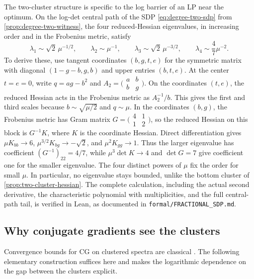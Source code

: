 The two-cluster structure is specific to the log barrier of an LP near
the optimum.  On the log-det central path of the SDP \eqref{eq:degree-two-sdp}
from \cref{prop:degree-two-witness}, the four reduced-Hessian eigenvalues, in
increasing order and in the Frobenius metric, satisfy
\[
 \lambda_1\sim\sqrt2\,\mu^{-1/2},\qquad
 \lambda_2\sim\mu^{-1},\qquad
 \lambda_3\sim\sqrt2\,\mu^{-3/2},\qquad
 \lambda_4\sim\frac47\mu^{-2}.
\]
To derive these, use tangent coordinates $(b,g,t,e)$
for the symmetric matrix with diagonal $(1-g-b,g,b)$ and upper
entries $(b,t,e)$. At the center $t=e=0$, write $q=ag-b^2$ and
$A_2=\bigl(\begin{smallmatrix}a&b\\b&g\end{smallmatrix}\bigr)$.
On the coordinates $(t,e)$, the reduced Hessian acts in the Frobenius
metric as $A_2^{-1}/b$.  This gives the first and third scales because
$b\sim\sqrt{\mu/2}$ and $q\sim\mu$.  In the coordinates $(b,g)$, the
Frobenius metric has Gram matrix
$G=\bigl(\begin{smallmatrix}4&1\\1&2\end{smallmatrix}\bigr)$, so the reduced
Hessian on this block is $G^{-1}K$, where $K$ is the coordinate Hessian.
Direct differentiation gives
$\mu K_{bb}\to6$, $\mu^{3/2}K_{bg}\to-\sqrt2$, and
$\mu^2K_{gg}\to1$. Thus the larger eigenvalue has coefficient
$(G^{-1})_{22}=4/7$, while
$\mu^3\det K\to4$ and $\det G=7$ give coefficient one for the smaller
eigenvalue.
The four distinct powers of $\mu$ fix the order for small $\mu$.  In
particular, no eigenvalue stays bounded, unlike the bottom cluster of
\cref{prop:two-cluster-hessian}.  The complete calculation, including the
actual second derivative, the characteristic polynomial with multiplicities,
and the full central-path tail, is verified in Lean, as documented in
\texttt{formal/FRACTIONAL\_SDP.md}.

\subsection{Why conjugate gradients see the clusters}
\label{sec:spectra-cg}

Convergence bounds for CG on clustered spectra are classical
\cite{axelsson1994-iterative-solution-methods}.  The following elementary
construction suffices here and makes the logarithmic dependence on the gap
between the clusters explicit.

